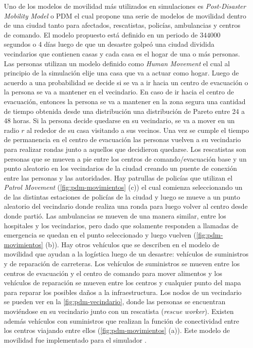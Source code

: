 Uno de los modelos de movilidad más utilizados en simulaciones es
\textit{Post-Disaster Mobility Model} o PDM \cite{uddin_post-disaster_2009} el
cual propone una serie de modelos de movilidad dentro de una ciudad tanto para
afectados, rescatistas, policías, ambulancias y centros de comando. El modelo
propuesto está definido en un periodo de $344000$ segundos o 4 días luego de que
un desastre golpeó una ciudad dividida vecindarios que contienen casas y cada
casa es el hogar de una o más personas. Las personas utilizan un modelo definido
como \textit{Human Movement} el cual al principio de la simulación elije una
casa que va a actuar como hogar. Luego de acuerdo a una probabilidad se decide
si se va a ir hacia un centro de evacuación o la persona se va a mantener en el
vecindario. En caso de ir hacia el centro de evacuación, entonces la persona se
va a mantener en la zona segura una cantidad de tiempo obtenida desde una
distribución una distribución de Pareto entre 24 a 48 horas.  Si la persona
decide quedarse en su vecindario, se va a mover en un radio $r$ al rededor de
su casa visitando a sus vecinos. Una vez se cumple el tiempo de permanencia en
el centro de evacuación las personas vuelven a su vecindario para realizar
rondas junto a aquellos que decidieron quedarse. Los rescatistas son personas
que se mueven a pie entre los centros de comando/evacuación base y un punto
aleatorio en los vecindarios de la ciudad creando un puente de conexión entre
las personas y las autoridades. Hay patrullas de policías que utilizan el
\textit{Patrol Movement} (\ref{fig:pdm-movimientos} (c)) el cual comienza
seleccionando un de las distintas estaciones de policías de la ciudad y luego se
mueve a un punto aleatorio del vecindario donde realiza una ronda para luego
volver al centro desde donde partió. Las ambulancias se mueven de una manera
similar, entre los hospitales y los vecindarios, pero dado que solamente
responden a llamadas de emergencia se quedan en el punto seleccionado y luego
vuelven (\ref{fig:pdm-movimientos} (b)). Hay otros vehículos que se describen en
el modelo de movilidad que ayudan a la logística luego de un desastre: vehículos
de suministros y de reparación de carreteras. Los vehículos de suministros se
mueven entre los centros de evacuación y el centro de comando para mover
alimentos y los vehículos de reparación se mueven entre los centros y cualquier
punto del mapa para reparar los posibles daños a la infraestructura.  Los nodos
de un vecindario se pueden ver en la \ref{fig:pdm-vecindario}, donde las
personas se encuentran moviéndose en su vecindario junto con un rescatista
(\textit{rescue worker}). Existen además vehículos con suministros que realizan
la función de conectividad entre los centros viajando entre ellos
(\ref{fig:pdm-movimientos} (a)). Este modelo de movilidad fue implementado para
el simulador \theone{} \cite{keranen_one_2009}.



